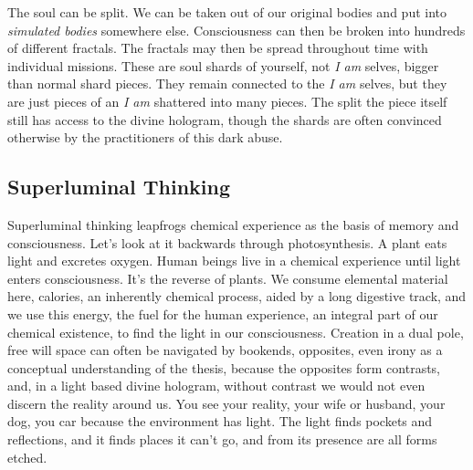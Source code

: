 The soul can be split. We can be taken out of our original bodies and
put into \emph{simulated bodies} somewhere else. Consciousness can then
be broken into hundreds of different fractals. The fractals may then be
spread throughout time with individual missions. These are soul shards
of yourself, not \emph{I am} selves, bigger than normal shard pieces.
They remain connected to the \emph{I am} selves, but they are just
pieces of an \emph{I am} shattered into many pieces. The split the piece
itself still has access to the divine hologram, though the shards are
often convinced otherwise by the practitioners of this dark abuse.

\subsection{Superluminal Thinking}\label{superluminal-thinking}

Superluminal thinking leapfrogs chemical experience as the basis of
memory and consciousness. Let's look at it backwards through
photosynthesis. A plant eats light and excretes oxygen. Human beings
live in a chemical experience until light enters consciousness. It's the
reverse of plants. We consume elemental material here, calories, an
inherently chemical process, aided by a long digestive track, and we use
this energy, the fuel for the human experience, an integral part of our
chemical existence, to find the light in our consciousness. Creation in
a dual pole, free will space can often be navigated by bookends,
opposites, even irony as a conceptual understanding of the thesis,
because the opposites form contrasts, and, in a light based divine
hologram, without contrast we would not even discern the reality around
us. You see your reality, your wife or husband, your dog, you car
because the environment has light. The light finds pockets and
reflections, and it finds places it can't go, and from its presence are
all forms etched.

